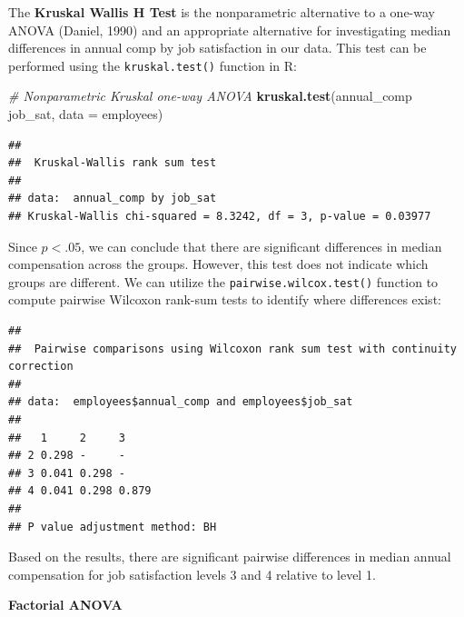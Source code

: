\documentclass[]{book}
\newenvironment{Shaded}{\begin{snugshade}}{\end{snugshade}}
\newcommand{\CommentTok}[1]{\textcolor[rgb]{0.56,0.35,0.01}{\textit{#1}}}
\newcommand{\DataTypeTok}[1]{\textcolor[rgb]{0.13,0.29,0.53}{#1}}
\newcommand{\KeywordTok}[1]{\textcolor[rgb]{0.13,0.29,0.53}{\textbf{#1}}}
\newcommand{\NormalTok}[1]{#1}
\newcommand{\OperatorTok}[1]{\textcolor[rgb]{0.81,0.36,0.00}{\textbf{#1}}}
\newcommand{\StringTok}[1]{\textcolor[rgb]{0.31,0.60,0.02}{#1}}
\begin{document}
The \textbf{Kruskal Wallis H Test} is the nonparametric alternative to a one-way ANOVA (Daniel, 1990) and an appropriate alternative for investigating median differences in annual comp by job satisfaction in our data. This test can be performed using the \texttt{kruskal.test()} function in R:

\begin{Shaded}
\begin{Highlighting}[]
\CommentTok{# Nonparametric Kruskal one-way ANOVA}
\KeywordTok{kruskal.test}\NormalTok{(annual_comp }\OperatorTok{~}\StringTok{ }\NormalTok{job_sat, }\DataTypeTok{data =}\NormalTok{ employees)}
\end{Highlighting}
\end{Shaded}

\begin{verbatim}
## 
##  Kruskal-Wallis rank sum test
## 
## data:  annual_comp by job_sat
## Kruskal-Wallis chi-squared = 8.3242, df = 3, p-value = 0.03977
\end{verbatim}

Since \(p < .05\), we can conclude that there are significant differences in median compensation across the groups. However, this test does not indicate which groups are different. We can utilize the \texttt{pairwise.wilcox.test()} function to compute pairwise Wilcoxon rank-sum tests to identify where differences exist:

\begin{Shaded}
\end{Shaded}

\begin{verbatim}
## 
##  Pairwise comparisons using Wilcoxon rank sum test with continuity correction 
## 
## data:  employees$annual_comp and employees$job_sat 
## 
##   1     2     3    
## 2 0.298 -     -    
## 3 0.041 0.298 -    
## 4 0.041 0.298 0.879
## 
## P value adjustment method: BH
\end{verbatim}

Based on the results, there are significant pairwise differences in median annual compensation for job satisfaction levels 3 and 4 relative to level 1.

\textbf{Factorial ANOVA}
\end{document}
